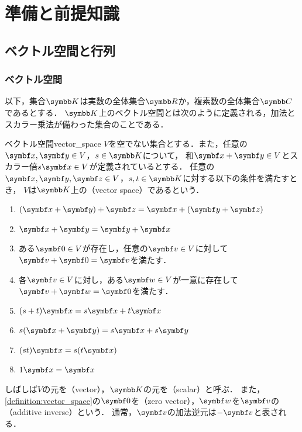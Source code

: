 \documentclass[../../main]{subfiles}
\begin{document}
\chapter{準備と前提知識}
\label{chapter:preliminary}

\section{ベクトル空間と行列}

\subsection{ベクトル空間}

以下，集合\(\numset{K}\)は実数の全体集合\(\numset{R}\)か，複素数の全体集合\(\numset{C}\)であるとする．
\(\numset{K}\)上のベクトル空間とは次のように定義される，加法とスカラー乗法が備わった集合のことである．

\begin{definition}{ベクトル空間}{vector_space}
  \(V\)を空でない集合とする．また，任意の\(\vect{x},\vect{y}\in V\)，\(s\in\numset{K}\)について，
  和\(\vect{x}+\vect{y}\in V\)とスカラー倍\(s\vect{x}\in V\)が定義されているとする．
  任意の\(\vect{x},\vect{y},\vect{z}\in V\)，\(s,t\in\numset{K}\)に対する以下の条件を満たすとき，
  \(V\)は\(\numset{K}\)上の（vector space）であるという．

  \begin{enumerate}
    \item \((\vect{x}+\vect{y})+\vect{z}=\vect{x}+(\vect{y}+\vect{z})\)
    \item \(\vect{x}+\vect{y}=\vect{y}+\vect{x}\)
    \item ある\(\zvec\in V\)が存在し，任意の\(\vect{v}\in V\)に対して\(\vect{v}+\zvec=\vect{v}\)を満たす．
    \item 各\(\vect{v}\in V\)に対し，ある\(\vect{w}\in V\)が一意に存在して\(\vect{v}+\vect{w}=\zvec\)を満たす．
    \item \((s+t)\vect{x}=s\vect{x}+t\vect{x}\)
    \item \(s(\vect{x}+\vect{y})=s\vect{x}+s\vect{y}\)
    \item \((st)\vect{x}=s(t\vect{x})\)
    \item \(1\vect{x}=\vect{x}\)
  \end{enumerate}
\end{definition}

しばしば\(V\)の元を（vector），\(\numset{K}\)の元を（scalar）と呼ぶ．
また，\cref{definition:vector_space}の\(\zvec\)を（zero vector），\(\vect{w}\)を\(\vect{v}\)の（additive inverse）という．
通常，\(\vect{v}\)の加法逆元は\(-\vect{v}\)と表される．
\end{document}
